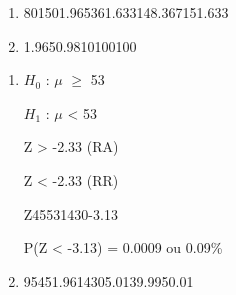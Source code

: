 
\begin{question}
    
    \begin{enumerate}[label={\textbf{\alph*)}}]

        \item 
              \begin{formula1}
                {80}{150}{1.96}{5}{36}{1.633}{148.367}{151.633}
              \end{formula1}
        \item 
              
              \begin{formula6}
                {1.96}{5}{0.98}{10}{100}{100}
              \end{formula6}
    \end{enumerate}
\end{question}


\begin{question}
    
    \begin{enumerate}[label={\textbf{\alph*)}}]
        
        \item 
        
            $H_0$ : $\mu$ $\geq$ 53 

            $H_1$ : $\mu$ < 53 

            Z > -2.33 (RA)

            Z < -2.33 (RR)

            \begin{formula7}
                {Z}{45}{53}{14}{30}{-3.13}
            \end{formula7}

            P(Z < -3.13) = 0.0009 ou 0.09\%
        \item 

            \begin{formula1}
               {95}{45}{1.96}{14}{30}{5.01}{39.99}{50.01}
            \end{formula1}
            
    \end{enumerate}
\end{question}

